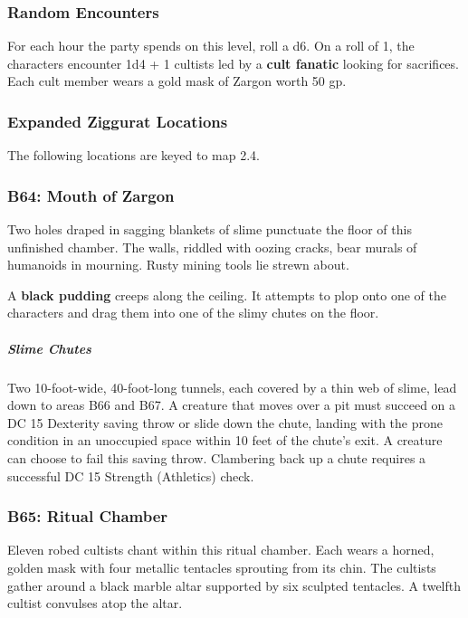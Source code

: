 \documentclass[10pt,a4paper,twoside,bg=print,twocolumn,openany,nodeprecatedcode]{dndbook}
\begin{document}
\subsubsection{Random Encounters}
For each hour the party spends on this level, roll a d6. On a roll of 1, the characters encounter 1d4 + 1 cultists led by a \textbf{cult fanatic} looking for sacrifices. Each cult member wears a gold mask of Zargon worth 50 gp.

\subsubsection{Expanded Ziggurat Locations}
The following locations are keyed to map 2.4.

\subsubsection{B64: Mouth of Zargon}
\begin{DndReadAloud}{}
Two holes draped in sagging blankets of slime punctuate the floor of this unfinished chamber. The walls, riddled with oozing cracks, bear murals of humanoids in mourning. Rusty mining tools lie strewn about.

\end{DndReadAloud}

A \textbf{black pudding} creeps along the ceiling. It attempts to plop onto one of the characters and drag them into one of the slimy chutes on the floor.

\subparagraph{Slime Chutes}
Two 10-foot-wide, 40-foot-long tunnels, each covered by a thin web of slime, lead down to areas B66 and B67. A creature that moves over a pit must succeed on a DC 15 Dexterity saving throw or slide down the chute, landing with the prone condition in an unoccupied space within 10 feet of the chute's exit. A creature can choose to fail this saving throw. Clambering back up a chute requires a successful DC 15 Strength (Athletics) check.

\subsubsection{B65: Ritual Chamber}
\begin{DndReadAloud}{}
Eleven robed cultists chant within this ritual chamber. Each wears a horned, golden mask with four metallic tentacles sprouting from its chin. The cultists gather around a black marble altar supported by six sculpted tentacles. A twelfth cultist convulses atop the altar.

\end{DndReadAloud}
\end{document}
